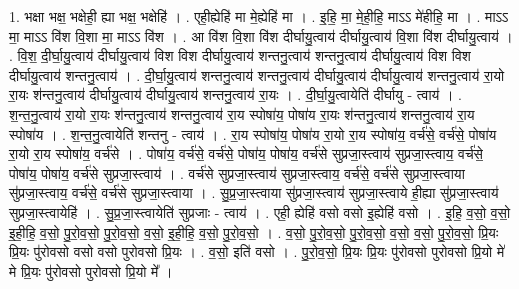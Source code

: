\documentclass[17pt]{extarticle}
\begin{document}
1. भक्षा भक्ष॒ भक्षेही॒ ह्या भक्ष॒ भक्षेहि॑ । . एही॒ह्येहि॑ मा मे॒ह्येहि॑ मा । . इ॒हि॒ मा॒ मे॒ही॒हि॒ माऽऽ मे॑हीहि॒ मा । . माऽऽ मा॒ माऽऽ वि॑श वि॒शा मा॒ माऽऽ वि॑श । . आ वि॑श वि॒शा वि॑श दीर्घायु॒त्वाय॑ दीर्घायु॒त्वाय॑ वि॒शा वि॑श दीर्घायु॒त्वाय॑ । . वि॒श॒ दी॒र्घा॒यु॒त्वाय॑ दीर्घायु॒त्वाय॑ विश विश दीर्घायु॒त्वाय॑ शन्तनु॒त्वाय॑ शन्तनु॒त्वाय॑ दीर्घायु॒त्वाय॑ विश विश दीर्घायु॒त्वाय॑ शन्तनु॒त्वाय॑ । . दी॒र्घा॒यु॒त्वाय॑ शन्तनु॒त्वाय॑ शन्तनु॒त्वाय॑ दीर्घायु॒त्वाय॑ दीर्घायु॒त्वाय॑ शन्तनु॒त्वाय॑ रा॒यो रा॒यः श॑न्तनु॒त्वाय॑ दीर्घायु॒त्वाय॑ दीर्घायु॒त्वाय॑ शन्तनु॒त्वाय॑ रा॒यः । . दी॒र्घा॒यु॒त्वायेति॑ दीर्घायु - त्वाय॑ । . श॒न्त॒नु॒त्वाय॑ रा॒यो रा॒यः श॑न्तनु॒त्वाय॑ शन्तनु॒त्वाय॑ रा॒य स्पोषा॑य॒ पोषा॑य रा॒यः श॑न्तनु॒त्वाय॑ शन्तनु॒त्वाय॑ रा॒य स्पोषा॑य । . श॒न्त॒नु॒त्वायेति॑ शन्तनु - त्वाय॑ । . रा॒य स्पोषा॑य॒ पोषा॑य रा॒यो रा॒य स्पोषा॑य॒ वर्च॑से॒ वर्च॑से॒ पोषा॑य रा॒यो रा॒य स्पोषा॑य॒ वर्च॑से । . पोषा॑य॒ वर्च॑से॒ वर्च॑से॒ पोषा॑य॒ पोषा॑य॒ वर्च॑से सुप्रजा॒स्त्वाय॑ सुप्रजा॒स्त्वाय॒ वर्च॑से॒ पोषा॑य॒ पोषा॑य॒ वर्च॑से सुप्रजा॒स्त्वाय॑ । . वर्च॑से सुप्रजा॒स्त्वाय॑ सुप्रजा॒स्त्वाय॒ वर्च॑से॒ वर्च॑से सुप्रजा॒स्त्वाया सु॑प्रजा॒स्त्वाय॒ वर्च॑से॒ वर्च॑से सुप्रजा॒स्त्वाया । . सु॒प्र॒जा॒स्त्वाया सु॑प्रजा॒स्त्वाय॑ सुप्रजा॒स्त्वाये ही॒ह्या सु॑प्रजा॒स्त्वाय॑ सुप्रजा॒स्त्वायेहि॑ । . सु॒प्र॒जा॒स्त्वायेति॑ सुप्रजाः - त्वाय॑ । . एही॒ ह्येहि॑ वसो वसो इ॒ह्येहि॑ वसो । . इ॒हि॒ व॒सो॒ व॒सो॒ इ॒ही॒हि॒ व॒सो॒ पु॒रो॒व॒सो॒ पु॒रो॒व॒सो॒ व॒सो॒ इ॒ही॒हि॒ व॒सो॒ पु॒रो॒व॒सो॒ । . व॒सो॒ पु॒रो॒व॒सो॒ पु॒रो॒व॒सो॒ व॒सो॒ व॒सो॒ पु॒रो॒व॒सो॒ प्रि॒यः प्रि॒यः पु॑रोवसो वसो वसो पुरोवसो प्रि॒यः । . व॒सो॒ इति॑ वसो । . पु॒रो॒व॒सो॒ प्रि॒यः प्रि॒यः पु॑रोवसो पुरोवसो प्रि॒यो मे॑ मे प्रि॒यः पु॑रोवसो पुरोवसो प्रि॒यो मे᳚ । \newline
\end{document}
